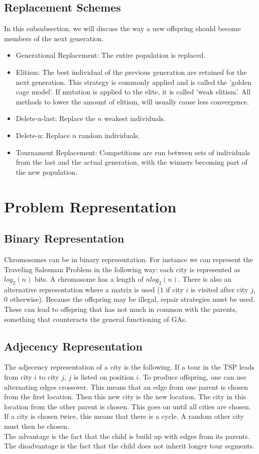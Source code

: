 \documentclass[12pt]{book}
\begin{document}
\subsection{Replacement Schemes}
In this subsubsection, we will discuss the way a new offspring should become members of the next generation.
\begin{itemize}
\item Generational Replacement: The entire population is replaced.
\item Elitism: The best individual of the previous generation are retained for the next generation. This strategy is commonly applied and is called the 'golden cage model'. If mutation is applied to the elite, it is called 'weak elitism'. All methods to lower the amount of elitism, will usually cause less convergence.
\item Delete-n-last: Replace the $n$ weakest individuals.
\item Delete-n: Replace $n$ random individuals.
\item Tournament Replacement: Competitions are run between sets of individuals from the last and the actual generation, with the winners becoming part of the new population.
\end{itemize}
\section{Problem Representation}
\subsection{Binary Representation}
Chromosomes can be in binary representation. For instance we can represent the Traveling Salesman Problem in the following way: each city is represented as $log_2(n)$ bits. A chromosome has a length of $nlog_2(n)$. There is also an alternative representation where a matrix is used ($1$ if city $i$ is visited after city $j$, $0$ otherwise). Because the offspring may be illegal, repair strategies must be used. These can lead to offspring that has not much in common with the parents, something that counteracts the general functioning of GAs.
\subsection{Adjecency Representation}
The adjecency representation of a city is the following. If a tour in the TSP leads from city $i$ to city $j$, $j$ is listed on position $i$. To produce offspring, one can use alternating edges crossover. This means that an edge from one parent is chosen from the first location. Then this new city is the new location. The city in this location from the other parent is chosen. This goes on until all cities are chosen. If a city is chosen twice, this means that there is a cycle. A random other city must then be chosen.\\
The advantage is the fact that the child is build up with edges from its parents. The disadvantage is the fact that the child does not inherit longer tour segments.
\end{document}
